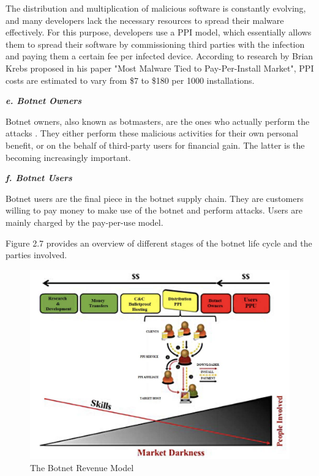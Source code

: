 			The distribution and multiplication of malicious software is constantly evolving, and many developers lack the necessary resources to spread their malware effectively. For this purpose, developers use a PPI model, which essentially allows them to spread their software by commissioning third parties with the infection and paying them a certain fee per infected device. According to research by Brian Krebs proposed in his paper "Most Malware Tied to Pay-Per-Install Market", PPI costs are estimated to vary from \$7 to \$180 per 1000 installations. \cite{Putman,Bottazzi14}

			\textbf{\textit{e. Botnet Owners}}
			
	Botnet owners, also known as botmasters, are the ones who actually perform the attacks \cite{Putman,Bottazzi14}. They either perform these malicious activities for their own personal benefit, or on the behalf of third-party users for financial gain. The latter is the becoming increasingly important. \cite{Li09}

			\textbf{\textit{f. Botnet Users}}
			
			Botnet users are the final piece in the botnet supply chain. They are customers willing to pay money to make use of the botnet and perform attacks. Users are mainly charged by the pay-per-use model.\cite{Putman,Bottazzi14}

Figure 2.7 provides an overview of different stages of the botnet life cycle and the parties involved. 


\begin{figure}[ht]
\begin{center} \includegraphics[scale=0.6]{Talk11/RevenueModel} \end{center}
\caption{The Botnet Revenue Model \cite{Bottazzi14}}
\label{label}
\end{figure}

